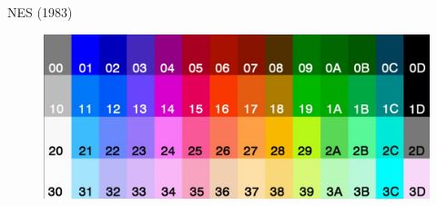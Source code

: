\documentclass{beamer}
\begin{document}
\begin{darkframes}
\begin{frame}{NES (1983)}
\begin{multicols}{2}
\begin{figure}[h!]
        \end{figure}
        \begin{figure}[h!]
            \centering
            \includegraphics[height=.2\textheight]{nes_palette}
        \end{figure}
    \end{multicols}
\end{frame}


\end{darkframes}
\end{document}
